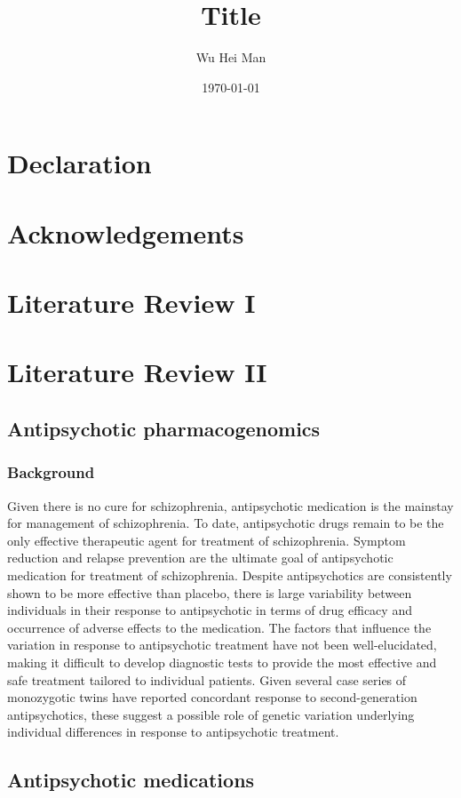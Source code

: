 \documentclass[12pt]{report}
\title{Title}
\date{\today}
\author{Wu Hei Man}
\begin{document}
	\maketitle
	\chapter*{Declaration}
	\chapter*{Acknowledgements}
	\tableofcontents
	
	\doublespacing
	
	\printbibliography
	\chapter{Literature Review I}
	\chapter{Literature Review II}
		\section{Antipsychotic pharmacogenomics}
		\subsection{Background}
			Given there is no cure for schizophrenia, antipsychotic medication is the mainstay for management of schizophrenia.
			To date, antipsychotic drugs remain to be the only effective therapeutic agent for treatment of schizophrenia. 
			Symptom reduction and relapse prevention are the ultimate goal of antipsychotic medication for treatment of schizophrenia. 
			Despite antipsychotics are consistently shown to be more effective than placebo, there is large variability between individuals in their response to antipsychotic in terms of drug efficacy and occurrence of adverse effects to the medication. 
			The factors that influence the variation in response to antipsychotic treatment have not been well-elucidated, making it difficult to develop diagnostic tests to provide the most effective and safe treatment tailored to individual patients. 
			Given several case series of monozygotic twins have reported concordant response to second-generation antipsychotics, these suggest a possible role of genetic variation underlying individual differences in response to antipsychotic treatment.  
		\section{Antipsychotic medications}
\end{document}
